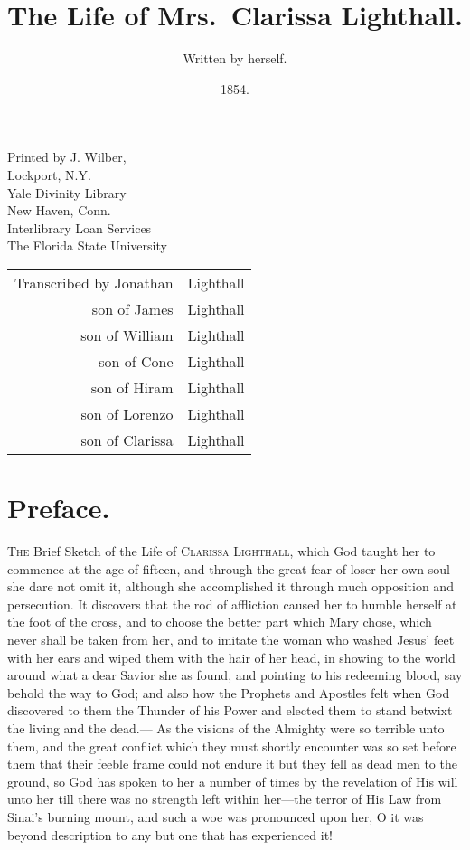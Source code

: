 \documentclass{article}
\title{The Life of Mrs.\ Clarissa Lighthall.}
\author{Written by herself.}
\date{1854.}
\begin{document}
\maketitle

\noindent Printed by J. Wilber,\\
Lockport, N.Y.\\

\noindent %
Yale Divinity Library\\
New Haven, Conn.\\

\noindent %
Interlibrary Loan Services\\
The Florida State University\\%

{\hspace*{-24pt} %
\begin{tabular}{r@{ }l}
Transcribed by Jonathan &Lighthall\\
son of James &Lighthall\\
son of William &Lighthall\\
son of Cone &Lighthall\\
son of Hiram &Lighthall\\
son of Lorenzo &Lighthall\\
son of Clarissa &Lighthall\\
\end{tabular}
}
\section*{Preface.}
\textsc{The} Brief Sketch of the Life of \textsc{Clarissa Lighthall}, which God taught her to commence
at the age of fifteen, and through the great fear of loser her own soul she dare not omit it,
although she accomplished it through much opposition and persecution. It discovers that the
rod of affliction caused her to humble herself at the foot of the cross, and to choose the better
part which Mary chose, which never shall be taken from her, and to imitate the woman who
washed Jesus' feet with her ears and wiped them with the hair of her head, in showing to
the world around what a dear Savior she as found, and pointing to his redeeming blood, say
behold the way to God; and also how the Prophets and Apostles felt when God discovered to
them the Thunder of his Power and elected them to stand betwixt the living and the dead.---
As the visions of the Almighty were so terrible unto them, and the great conflict which they
must shortly encounter was so set before them that their feeble frame could not endure it but
they fell as dead men to the ground, so God has spoken to her a number of times by the revelation
of His will unto her till there was no strength left within her---the terror of His Law
from Sinai's burning mount, and such a woe was pronounced upon her, O it was beyond
description to any but one that has experienced it!
\end{document}
